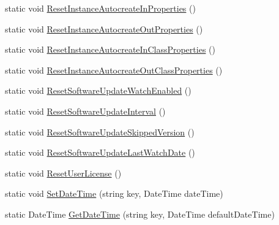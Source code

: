 \begin{DoxyCompactItemize}
\item 
static void \hyperlink{classi_c_s___preferences_controller_a28ade1b54660575cd2a8f8db0197fba4}{Reset\+Instance\+Autocreate\+In\+Properties} ()
\item 
static void \hyperlink{classi_c_s___preferences_controller_a59cb682f93dfbf856d0ba21168fae40c}{Reset\+Instance\+Autocreate\+Out\+Properties} ()
\item 
static void \hyperlink{classi_c_s___preferences_controller_afa554e3472bbe2c26cba91ccbacd84dd}{Reset\+Instance\+Autocreate\+In\+Class\+Properties} ()
\item 
static void \hyperlink{classi_c_s___preferences_controller_a25b32438b51e3bce2c87dc5f81a08118}{Reset\+Instance\+Autocreate\+Out\+Class\+Properties} ()
\item 
static void \hyperlink{classi_c_s___preferences_controller_abf1f26a389305758cec08044256b146f}{Reset\+Software\+Update\+Watch\+Enabled} ()
\item 
static void \hyperlink{classi_c_s___preferences_controller_a306470c5492d36a751ef5d3ada2874c5}{Reset\+Software\+Update\+Interval} ()
\item 
static void \hyperlink{classi_c_s___preferences_controller_af8710d77154bd6dcc2a9e15fb9753fd7}{Reset\+Software\+Update\+Skipped\+Version} ()
\item 
static void \hyperlink{classi_c_s___preferences_controller_afcabc459894196227dedd43f2a5d8c2c}{Reset\+Software\+Update\+Last\+Watch\+Date} ()
\item 
static void \hyperlink{classi_c_s___preferences_controller_af4d31087f86edc359101d45dde89f1d8}{Reset\+User\+License} ()
\item 
static void \hyperlink{classi_c_s___preferences_controller_ae2603b5e24b1a137fa2521c0279c996e}{Set\+Date\+Time} (string key, Date\+Time date\+Time)
\item 
static Date\+Time \hyperlink{classi_c_s___preferences_controller_af71e54f98869ad576132ee2dec827a97}{Get\+Date\+Time} (string key, Date\+Time default\+Date\+Time)
\end{DoxyCompactItemize}
